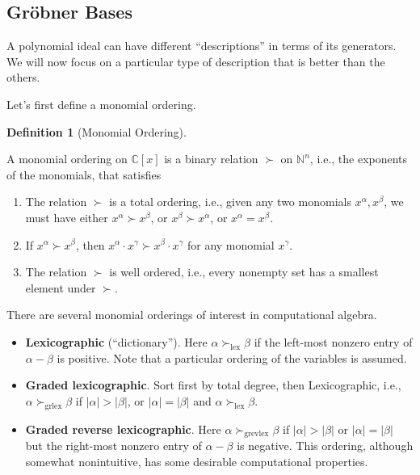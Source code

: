 \documentclass[
]{book}
\theoremstyle{definition}
\newtheorem{definition}{Definition}[chapter]
\theoremstyle{definition}
\theoremstyle{definition}
\theoremstyle{definition}
\theoremstyle{remark}
\begin{document}
\subsection{Gröbner Bases}\label{gruxf6bner-bases}

A polynomial ideal can have different ``descriptions'' in terms of its generators. We will now focus on a particular type of description that is better than the others.

Let's first define a monomial ordering.

\begin{definition}[Monomial Ordering]
\protect\hypertarget{def:MonomialOrdering}{}\label{def:MonomialOrdering}

A monomial ordering on \(\mathbb{C}[x]\) is a binary relation \(\succ\) on \(\mathbb{N}^n\), i.e., the exponents of the monomials, that satisfies

\begin{enumerate}
\def\labelenumi{\arabic{enumi}.}
\item
  The relation \(\succ\) is a total ordering, i.e., given any two monomials \(x^{\alpha}, x^{\beta}\), we must have either \(x^{\alpha} \succ x^{\beta}\), or \(x^\beta \succ x^\alpha\), or \(x^\alpha = x^\beta\).
\item
  If \(x^\alpha \succ x^\beta\), then \(x^\alpha \cdot x^\gamma \succ x^\beta \cdot x^\gamma\) for any monomial \(x^\gamma\).
\item
  The relation \(\succ\) is well ordered, i.e., every nonempty set has a smallest element under \(\succ\).
\end{enumerate}

\end{definition}

There are several monomial orderings of interest in computational algebra.

\begin{itemize}
\item
  \textbf{Lexicographic} (``dictionary''). Here \(\alpha \succ_{\mathrm{lex}}\beta\) if the left-most nonzero entry of \(\alpha - \beta\) is positive. Note that a particular ordering of the variables is assumed.
\item
  \textbf{Graded lexicographic}. Sort first by total degree, then Lexicographic, i.e., \(\alpha \succ_{\mathrm{grlex}}\beta\) if \(|\alpha| > |\beta|\), or \(|\alpha| = |\beta|\) and \(\alpha \succ_{\mathrm{lex}}\beta\).
\item
  \textbf{Graded reverse lexicographic}. Here \(\alpha \succ_{\mathrm{grevlex}}\beta\) if \(|\alpha| > |\beta|\) or \(|\alpha| = |\beta|\) but the right-most nonzero entry of \(\alpha - \beta\) is negative. This ordering, although somewhat nonintuitive, has some desirable computational properties.
\end{itemize}
\end{document}
